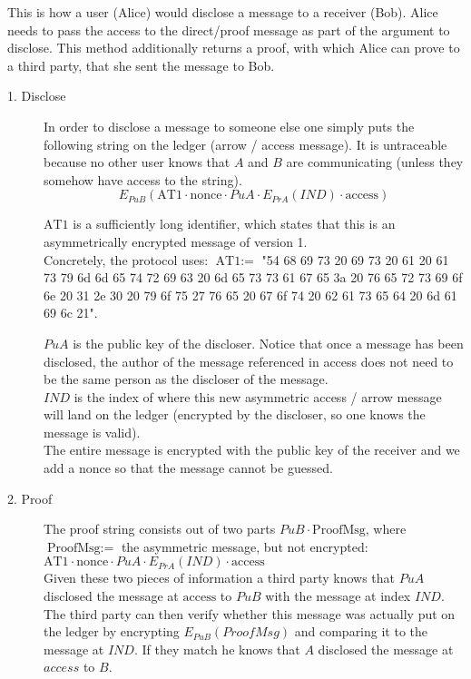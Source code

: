 \documentclass[a4paper]{article} %
\begin{document}
This is how a user (Alice) would disclose a message to a receiver (Bob). Alice needs to pass the access to the direct/proof message as part of the argument to disclose. This method additionally returns a proof, with which Alice can prove to a third party, that she sent the message to Bob. 



\begin{description}
\item[1. Disclose] In order to disclose a message to someone else one simply puts the following string on the ledger (arrow / access message).
It is untraceable because no other user knows that $A$ and $B$ are communicating (unless they somehow have access to the string).
    $$E_{PuB}(\text{AT1} \cdot \text{nonce} \cdot PuA \cdot E_{PrA}(IND) \cdot \text{access})$$
    
    $\text{AT1}$ is a sufficiently long identifier, which states that this is an asymmetrically encrypted message of version 1. \\
    Concretely, the protocol uses: $\text{AT1} :=$ "54 68 69 73 20 69 73 20 61 20 61 73 79 6d 6d 65 74 72 69 63 20 6d 65 73 73 61 67 65 3a 20 76 65 72 73 69 6f 6e 20 31 2e 30 20 79 6f 75 27 76 65 20 67 6f 74 20 62 61 73 65 64 20 6d 61 69 6c 21".
    
    $PuA$ is the public key of the discloser. Notice that once a message has been disclosed, the author of the message referenced in access does not need to be the same person as the discloser of the message. \\
    $IND$ is the index of where this new asymmetric access / arrow message will land on the ledger (encrypted by the discloser, so one knows the message is valid). \\
    The entire message is encrypted with the public key of the receiver and we add a nonce so that the message cannot be guessed.
\item[2. Proof] The proof string consists out of two parts $PuB \cdot \text{ProofMsg}$, where \\
$\text{ProofMsg} :=$ the asymmetric message, but not encrypted: $\text{AT1} \cdot \text{nonce} \cdot PuA \cdot E_{PrA}(IND) \cdot \text{access}$ \\
Given these two pieces of information a third party knows that $PuA$ disclosed the message at $\text{access}$ to $PuB$ with the message at index $IND$. The third party can then verify whether this message was actually put on the ledger by encrypting $E_{PuB}(ProofMsg)$ and comparing it to the message at $IND$. If they match he knows that $A$ disclosed the message at $access$ to $B$.
\end{description}
\end{document}
